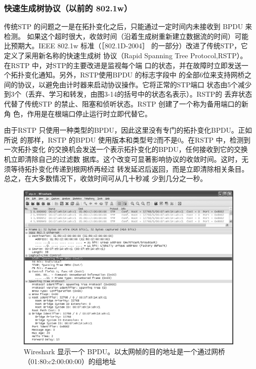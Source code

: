 \subsubsection{快速生成树协议（以前的 802.1w）}

传统STP 的问题之一是在拓扑变化之后，只能通过一定时间内未接收到 BPDU 来检测。
如果这个超时很大，收敛时间（沿着生成树重新建立数据流的时间）可能比预期大。IEEE
802.1w 标准（［802.1D-2004］ 的一部分）改进了传统STP，它定义了采用新名称的快速生成树
协议（Rapid Spanning Tree Protocol,RSTP）。在RSTP 中，对STP的主要改进是监视每个端
口的状态，并在故障时立即发送一个拓扑变化通知。另外，RSTP使用BPDU 的标志字段中
的全部6位来支持网桥之间的协议，以避免由计时器来启动协议操作。它将正常的STP端口
状态由5个减少到3个（丢弃、学习和转发，由图3-14的括号中的状态名表示）。RSTP的
丢弃状态代替了传统STP 的禁止、阻塞和侦听状态。RSTP 创建了一个称为备用端口的新角
色，作用是在根端口停止运行时立即代替它。

由于RSTP 只使用一种类型的BPDU，因此这里没有专门的拓扑变化BPDU。正如所说
的那样，RSTP 的BPDU 使用版本和类型号2而不是0。在RSTP 中，检测到一次拓扑变化
的交换机会发送一个表示拓扑变化的BPDU，任何接收到它的交换机立即清除自己的过滤数
据库。这个改变可显著影响协议的收敛时间。这时，无须等待拓扑变化传递到根网桥再经过
转发延迟后返回，而是立即清除相关条目。总之，在大多数情况下，收敛时间可从几十秒减
少到几分之一秒。

\begin{figure}
  \centering
  \includegraphics[scale=0.5]{imgs/3/3-16.png}
  \caption{Wireshark 显示一个 BPDU。以太网帧的目的地址是一个通过网桥（01:80:c2:00:00:00）的组地址}
\end{figure}

